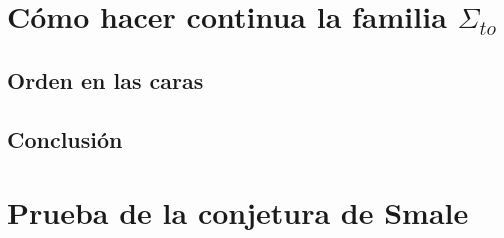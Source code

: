 \documentclass[twoside, 11pt]{article}
\begin{document}
\section{Cómo hacer continua la familia $\Sigma_{to}$}
\subsection{Orden en las caras}
\subsection{Conclusión}


\section{Prueba de la conjetura de Smale}

\begin{thebibliography}{}
\end{thebibliography}
\end{document}

